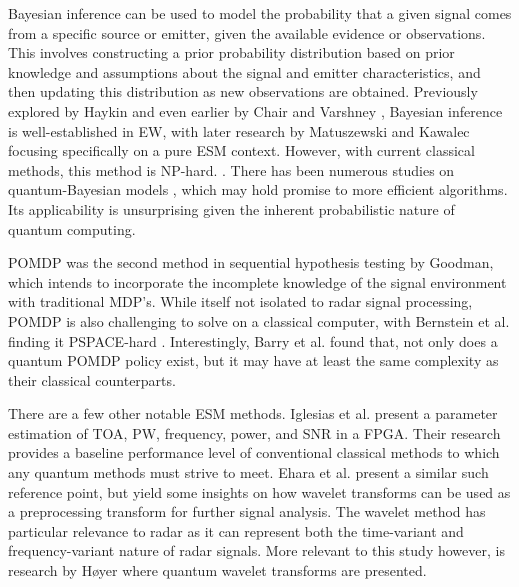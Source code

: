 Bayesian inference can be used to model the probability that a given signal comes from a specific source or emitter, given the available evidence or observations.
This involves constructing a prior probability distribution based on prior knowledge and assumptions about the signal and emitter characteristics, and then updating this distribution as new observations are obtained.
Previously explored by Haykin \cite{haykin_cognitive_2006} and even earlier by Chair and Varshney \cite{chair_distributed_1988}, Bayesian inference is well-established in \ac{EW}, with later research by Matuszewski and Kawalec \cite{matuszewski_knowledge-based_2008} focusing specifically on a pure \ac{ESM} context.
However, with current classical methods, this method is NP-hard. \cite{cooper_computational_1990}.
There has been numerous studies on quantum-Bayesian models \cite{nimbe_models_2021}, which may hold promise to more efficient algorithms. 
Its applicability is unsurprising given the inherent probabilistic nature of quantum computing.

\ac{POMDP} was the second method in sequential hypothesis testing by Goodman, which intends to incorporate the incomplete knowledge of the signal environment with traditional \ac{MDP}'s.
While itself not isolated to radar signal processing, \ac{POMDP} is also challenging to solve on a classical computer, with Bernstein et al. finding it PSPACE-hard \cite{bernstein_complexity_2002}.
 Interestingly, Barry et al. \cite{barry_quantum_2014} found that, not only does a quantum \ac{POMDP} policy exist, but it may have at least the same complexity as their classical counterparts.

There are a few other notable \ac{ESM} methods.
Iglesias et al. \cite{iglesias_real-time_2014} present a parameter estimation of \ac{TOA}, \ac{PW}, frequency, power, and \ac{SNR} in a \ac{FPGA}.
Their research provides a baseline performance level of conventional classical methods to which any quantum methods must strive to meet.
Ehara et al. \cite{ehara_weak_1994} present a similar such reference point, but yield some insights on how wavelet transforms can be used as a preprocessing transform for further signal analysis.
The wavelet method has particular relevance to radar as it can represent both the time-variant and frequency-variant nature of radar signals.
More relevant to this study however, is research by Høyer \cite{hoyer_efficient_1997} where quantum wavelet transforms are presented.


